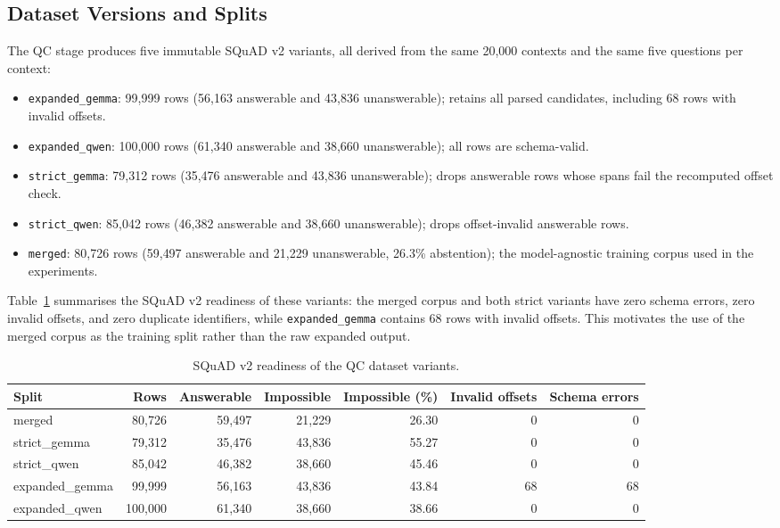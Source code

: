 \documentclass[graybox]{SNmult}
\begin{document}
\subsection{Dataset Versions and Splits}

The QC stage produces five immutable SQuAD v2 variants, all derived from the
same 20{,}000 contexts and the same five questions per context:

\begin{itemize}
\item \texttt{expanded\_gemma}: 99{,}999 rows (56{,}163 answerable and 43{,}836
  unanswerable); retains all parsed candidates, including 68 rows with invalid
  offsets.
\item \texttt{expanded\_qwen}: 100{,}000 rows (61{,}340 answerable and 38{,}660
  unanswerable); all rows are schema-valid.
\item \texttt{strict\_gemma}: 79{,}312 rows (35{,}476 answerable and 43{,}836
  unanswerable); drops answerable rows whose spans fail the recomputed offset
  check.
\item \texttt{strict\_qwen}: 85{,}042 rows (46{,}382 answerable and 38{,}660
  unanswerable); drops offset-invalid answerable rows.
\item \texttt{merged}: 80{,}726 rows (59{,}497 answerable and 21{,}229
  unanswerable, 26.3\% abstention); the model-agnostic training corpus used in
  the experiments.
\end{itemize}

Table~\ref{tab:readiness} summarises the SQuAD v2 readiness of these variants:
the merged corpus and both strict variants have zero schema errors, zero
invalid offsets, and zero duplicate identifiers, while \texttt{expanded\_gemma}
contains 68 rows with invalid offsets. This motivates the use of the merged
corpus as the training split rather than the raw expanded output.

\begin{table}[!t]
\caption{SQuAD v2 readiness of the QC dataset variants.}
\label{tab:readiness}
\centering
\small
\begin{tabular}{lrrrrrr}
\toprule
Split & Rows & Answerable & Impossible & Impossible (\%) & Invalid offsets & Schema errors \\
\midrule
merged & 80{,}726 & 59{,}497 & 21{,}229 & 26.30 & 0 & 0 \\
strict\_gemma & 79{,}312 & 35{,}476 & 43{,}836 & 55.27 & 0 & 0 \\
strict\_qwen & 85{,}042 & 46{,}382 & 38{,}660 & 45.46 & 0 & 0 \\
expanded\_gemma & 99{,}999 & 56{,}163 & 43{,}836 & 43.84 & 68 & 68 \\
expanded\_qwen & 100{,}000 & 61{,}340 & 38{,}660 & 38.66 & 0 & 0 \\
\bottomrule
\end{tabular}
\end{table}
\end{document}
